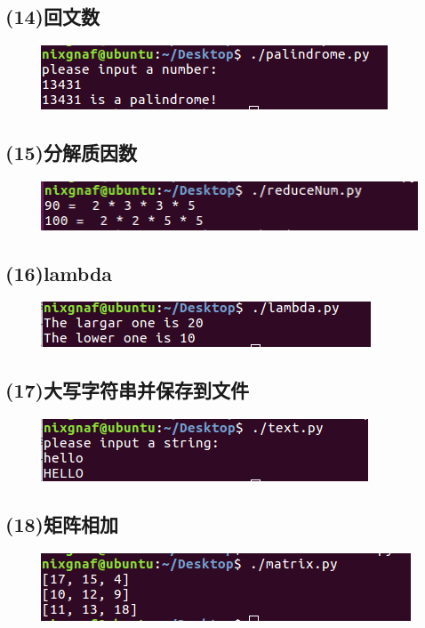 \documentclass{article}
\begin{document}
\subsection{(14)回文数}

\begin{figure}[h]
    \centering
    \includegraphics[width=0.5\linewidth]{image18.png}
\end{figure}

\subsection{(15)分解质因数}

\begin{figure}[h]
    \centering
    \includegraphics[width=0.5\linewidth]{image16.png}
\end{figure}

\subsection{(16)lambda}

\begin{figure}[h]
    \centering
    \includegraphics[width=0.5\linewidth]{image19.png}
\end{figure}

\subsection{(17)大写字符串并保存到文件}

\begin{figure}[h]
    \centering
    \includegraphics[width=0.5\linewidth]{image21.png}
\end{figure}

\subsection{(18)矩阵相加}

\begin{figure}[h]
    \centering
    \includegraphics[width=0.5\linewidth]{image22.png}
\end{figure}
\end{document}
